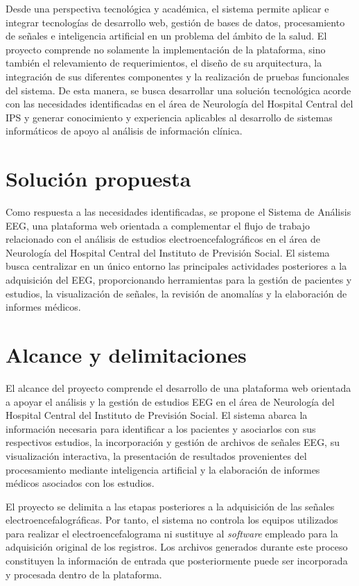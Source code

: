 Desde una perspectiva tecnológica y académica, el sistema permite aplicar e
integrar tecnologías de desarrollo web, gestión de bases de datos,
procesamiento de señales e inteligencia artificial en un problema del ámbito
de la salud. El proyecto comprende no solamente la implementación de la
plataforma, sino también el relevamiento de requerimientos, el diseño
de su arquitectura, la integración de sus diferentes componentes
y la realización de pruebas funcionales del sistema. De esta manera, se busca desarrollar una solución tecnológica acorde con las necesidades identificadas en el área de Neurología del Hospital Central del IPS y generar conocimiento y experiencia aplicables al desarrollo de sistemas informáticos
de apoyo al análisis de información clínica.

\section{Solución propuesta}
\label{sec:solucion-propuesta}

Como respuesta a las necesidades identificadas, se propone el Sistema de Análisis EEG, una
plataforma web orientada a complementar el flujo de trabajo relacionado con
el análisis de estudios electroencefalográficos en el área de Neurología del
Hospital Central del Instituto de Previsión Social. El sistema busca
centralizar en un único entorno las principales actividades posteriores a la
adquisición del EEG, proporcionando herramientas para la gestión de pacientes
y estudios, la visualización de señales, la revisión de anomalías y la
elaboración de informes médicos.

\section{Alcance y delimitaciones}
\label{sec:alcance}

El alcance del proyecto comprende el desarrollo de una plataforma web
orientada a apoyar el análisis y la gestión de estudios EEG en el área de
Neurología del Hospital Central del Instituto de Previsión Social. El sistema
abarca la información necesaria para identificar a los pacientes y asociarlos
con sus respectivos estudios, la incorporación y gestión de archivos de
señales EEG, su visualización interactiva, la presentación de resultados
provenientes del procesamiento mediante inteligencia artificial y la
elaboración de informes médicos asociados con los estudios.

El proyecto se delimita a las etapas posteriores a la adquisición de las
señales electroencefalográficas. Por tanto, el sistema no controla los equipos
utilizados para realizar el electroencefalograma ni sustituye al \textit{software}
empleado para la adquisición original de los registros. Los archivos
generados durante este proceso constituyen la información de entrada que
posteriormente puede ser incorporada y procesada dentro de la plataforma.

